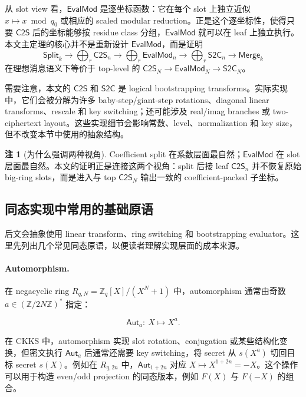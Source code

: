 \documentclass[UTF8,11pt]{article}
\newcommand{\Split}{\mathsf{Split}}
\newcommand{\Merge}{\mathsf{Merge}}
\newcommand{\CtwoS}{\mathsf{C2S}}
\newcommand{\StwoC}{\mathsf{S2C}}
\newcommand{\EvalMod}{\mathsf{EvalMod}}
\theoremstyle{definition}
\newtheorem{remark}{注}
\theoremstyle{plain}
\begin{document}
从 slot view 看，\(\EvalMod\) 是逐坐标函数：它在每个 slot 上独立近似 \(x\mapsto x\bmod q_0\) 或相应的 scaled modular reduction。正是这个逐坐标性，使得只要 \(\CtwoS\) 后的坐标能够按 residue class 分组，\(\EvalMod\) 就可以在 leaf 上独立执行。本文主定理的核心并不是重新设计 \(\EvalMod\)，而是证明
\[
\Split_k
\longrightarrow
\bigoplus_r \CtwoS_n
\longrightarrow
\bigoplus_r \EvalMod_n
\longrightarrow
\bigoplus_r \StwoC_n
\longrightarrow
\Merge_k
\]
在理想消息语义下等价于 top-level 的 \(\CtwoS_N\to\EvalMod_N\to\StwoC_N\)。

需要注意，本文的 \(\CtwoS\) 和 \(\StwoC\) 是 logical bootstrapping transforms。实际实现中，它们会被分解为许多 baby-step/giant-step rotations、diagonal linear transforms、rescale 和 key switching；还可能涉及 real/imag branches 或 two-ciphertext layout。这些实现细节会影响常数、level、normalization 和 key size，但不改变本节中使用的抽象结构。

\begin{remark}[为什么强调两种视角]
Coefficient split 在系数层面最自然；\(\EvalMod\) 在 slot 层面最自然。本文的证明正是连接这两个视角：split 后接 leaf \(\CtwoS_n\) 并不恢复原始 big-ring slots，而是进入与 top \(\CtwoS_N\) 输出一致的 coefficient-packed 子坐标。
\end{remark}

\subsection{同态实现中常用的基础原语}
\label{subsec:implementation-primitives}

后文会抽象使用 linear transform、ring switching 和 bootstrapping evaluator。这里先列出几个常见同态原语，以便读者理解实现层面的成本来源。

\paragraph{Automorphism.}
在 negacyclic ring \(R_{q,N}=\mathbb Z_q[X]/(X^N+1)\) 中，automorphism 通常由奇数 \(a\in(\mathbb Z/2N\mathbb Z)^*\) 指定：

\[
{\mathsf{Aut}}_{a}:\ X\mapsto X^a.
\]

在 CKKS 中，automorphism 实现 slot rotation、conjugation 或某些结构化变换，但密文执行 \({\mathsf{Aut}}_{a}\) 后通常还需要 key switching，将 secret 从 \(s(X^a)\) 切回目标 secret \(s(X)\)。例如在 \(R_{q,2n}\) 中，\({\mathsf{Aut}}_{1+2n}\) 对应 \(X\mapsto X^{1+2n}=-X\)。这个操作可以用于构造 even/odd projection 的同态版本，例如 \(F(X)\) 与 \(F(-X)\) 的组合。
\end{document}
